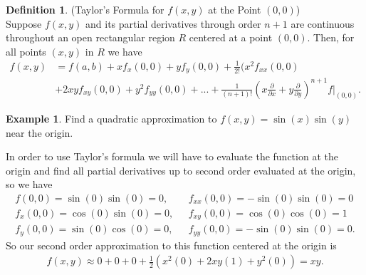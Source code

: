 \documentclass[12pt, letter]{article}
\theoremstyle{plain}
\numberwithin{theorem}{section}
\theoremstyle{definition}
\newtheorem{definition}[theorem]{Definition}
\newtheorem{example}[theorem]{Example}
\begin{document}
\begin{definition}{(Taylor's Formula for $f(x,y)$ at the Point $(0,0)$)}
\\
Suppose $f(x,y)$ and its partial derivatives through order $n+1$ are continuous throughout an open rectangular region $R$ centered at a point $(0,0)$. Then, for all points $(x,y)$ in $R$ we have
\begin{align*}
f(x,y) &= f(a,b) + xf_x(0,0)+yf_y(0,0)+\frac{1}{2!}(x^2 f_{xx}(0,0)\\
 &+2xyf_{xy}(0,0)+y^2f_{yy}(0,0) + ... + \frac{1}{(n+1)!}\left(x\frac{\partial }{\partial x}+y\frac{\partial}{\partial y}\right)^{n+1}f\rvert_{(0,0)}.
\end{align*}
\end{definition}

\bigskip

\hrulefill

\bigskip

\begin{example}
Find a quadratic approximation to $f(x,y) = \sin(x)\sin(y)$ near the origin.

\bigskip

In order to use Taylor's formula we will have to evaluate the function at the origin and find all partial derivatives up to second order evaluated at the origin, so we have
\begin{align*}
f(0,0) = \sin(0)\sin(0) = 0, \ \ \ &f_{xx}(0,0) = -\sin(0)\sin(0) = 0 \\
f_x(0,0) = \cos(0)\sin(0) = 0, \ \ \ &f_{xy}(0,0) = \cos(0)\cos(0) = 1\\
f_y(0,0) = \sin(0)\cos(0) = 0, \ \ \ &f_{yy}(0,0) = -\sin(0)\sin(0) = 0.
\end{align*}
So our second order approximation to this function centered at the origin is
\begin{align*}
f(x,y) \approx 0+0+0 + \frac{1}{2}\left(x^2(0)+2xy(1)+y^2(0)\right) = xy.
\end{align*}
\end{example}
\end{document}
